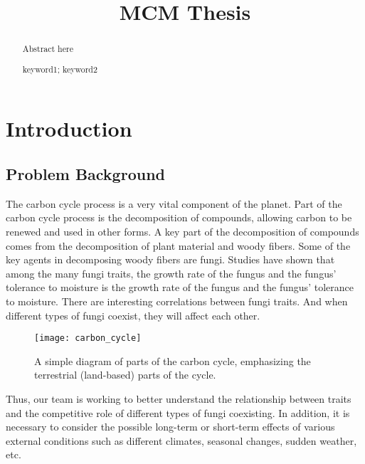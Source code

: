 \documentclass{mcmthesis}
\title{MCM Thesis}
\begin{document}
\begin{abstract}
  Abstract here


\begin{keywords}
keyword1; keyword2
\end{keywords}
\end{abstract}
\maketitle
\tableofcontents
\newpage

\section{Introduction}
\subsection{Problem Background}

The carbon cycle process is a very vital component of the planet. Part of the carbon cycle process is the decomposition of compounds, allowing carbon to be renewed and used in other forms. A key part of the decomposition of compounds comes from the decomposition of plant material and woody fibers. Some of the key agents in decomposing woody fibers are fungi. Studies have shown that among the many fungi traits, the growth rate of the fungus and the fungus' tolerance to moisture is the growth rate of the fungus and the fungus' tolerance to moisture. There are interesting correlations between fungi traits. And when different types of fungi coexist, they will affect each other. 

\begin{figure}[h]
\small
\centering
\texttt{[image: carbon\_cycle]}
\caption{A simple diagram of parts of the carbon cycle, emphasizing the terrestrial (land-based) parts of the cycle.\cite{carbon_cycle}}
\label{carbon_cycle}
\end{figure}

Thus, our team is working to better understand the relationship between traits and the competitive role of different types of fungi coexisting. In addition, it is necessary to consider the possible long-term or short-term effects of various external conditions such as different climates, seasonal changes, sudden weather, etc. 
\end{document}
